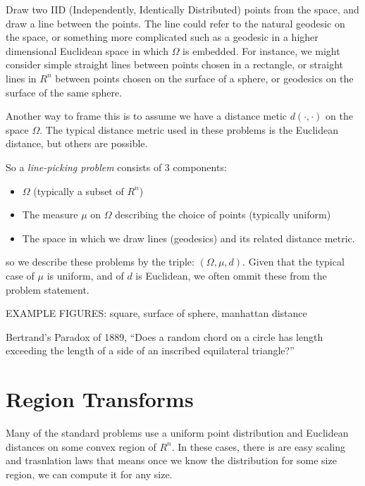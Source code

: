 \documentclass{article}
\begin{document}
Draw two IID (Independently, Identically Distributed) points from the
space, and draw a line between the points. The line could refer to the
natural geodesic on the space, or something more complicated such as
a geodesic in a higher dimensional Euclidean space in which $\Omega$
is embedded. For instance, we might consider simple straight lines
between points chosen in a rectangle, or straight lines in $R^n$
between points chosen on the surface of a sphere, or geodesics on the
surface of the same sphere.

Another way to frame this is to assume we have a distance metic
$d(\cdot, \cdot)$ on the space $\Omega$. The typical distance metric
used in these problems is the Euclidean distance, but others are
possible.

So a {\em line-picking problem} consists of 3 components:
\begin{itemize}

\item $\Omega$ (typically a subset of $R^n$)

\item The measure $\mu$ on $\Omega$ describing the choice of points
  (typically uniform)

\item The space in which we draw lines (geodesics) and its related
  distance metric.

\end{itemize}
so we describe these problems by the triple: $(\Omega, \mu, d)$. Given
that the typical case of $\mu$ is uniform, and of $d$ is Euclidean, we
often ommit these from the problem statement.

EXAMPLE FIGURES: square, surface of sphere, manhattan distance



Bertrand's Paradox of 1889, ``Does a random chord on a circle has
length exceeding the length of a side of an inscribed equilateral
triangle?''



\section{Region Transforms}
\label{sec:scaling}

Many of the standard problems use a uniform point distribution and
Euclidean distances on some convex region of $R^n$. In these cases,
there is are easy scaling and trasnlation laws that means once we know
the distribution for some size region, we can compute it for any size.
\end{document}
